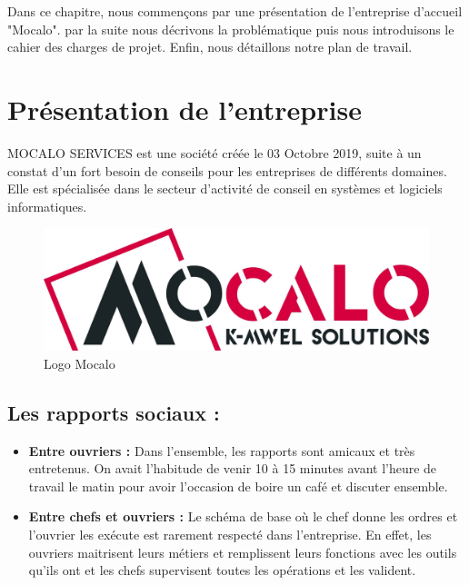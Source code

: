 
\hspace{4mm}
Dans ce chapitre, nous commençons par une présentation de l'entreprise d'accueil "Mocalo". par la suite nous décrivons la problématique puis nous introduisons le cahier des charges de projet. Enfin, nous détaillons notre plan de travail.

\section{ Présentation de l’entreprise }

\hspace{4mm} MOCALO SERVICES est une société créée le 03 Octobre 2019, suite à un constat d’un fort besoin de conseils pour les entreprises de différents domaines. Elle est spécialisée dans le secteur d'activité de conseil en systèmes et logiciels informatiques.
\begin{figure}[h]
    \centering
    \includegraphics[scale=0.2]{figures/aniskab.jpg}
    \caption{Logo Mocalo}
    \label{fig:logo_mocalo}
\end{figure}
\subsection{ 	Les rapports sociaux : }

\begin{itemize}
    \item	\textbf{Entre ouvriers :} Dans l’ensemble, les rapports sont amicaux et très entretenus. On avait l’habitude de venir 10 à 15 minutes avant l’heure de travail le matin pour avoir l’occasion de boire un café et discuter ensemble. 
\newpage    \item \textbf{Entre chefs et ouvriers :} Le schéma de base où le chef donne les ordres et l’ouvrier les exécute est rarement respecté dans l’entreprise. En effet, les ouvriers maitrisent leurs métiers et remplissent leurs fonctions avec les outils qu’ils ont et les chefs supervisent toutes les opérations et les valident.
\end{itemize}

